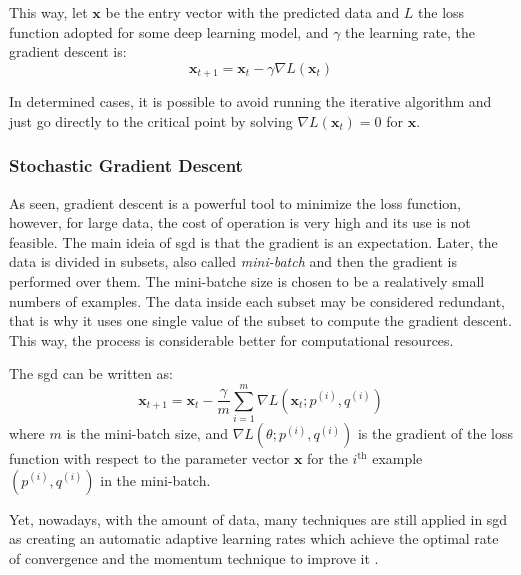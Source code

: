 This way, let \(\symbf{x}\) be the entry vector with the predicted data and \(L\) the loss function adopted for some deep learning model, and \(\gamma\) the learning rate, the gradient descent is:
%
\begin{equation}
    \symbf{x}_{t+1} = \symbf{x}_t - \gamma\nabla L(\symbf{x}_t)
\end{equation}

In determined cases, it is possible to avoid running the iterative algorithm and just go directly to the critical point by solving \(\nabla L(\symbf{x}_t) = 0\) for \(\symbf{x}\).

\subsubsection*{Stochastic Gradient Descent}

As seen, gradient descent is a powerful tool to minimize the loss function, however, for large data, the cost of operation is very high and its use is not feasible. 
The main ideia of \gls*{sgd} is that the gradient is an expectation.
Later, the data is divided in subsets, also called \emph{mini-batch} and then the gradient is performed over them.
The mini-batche size is chosen to be a realatively small numbers of examples.
The data inside each subset may be considered redundant, that is why it uses one single value of the subset to compute the gradient descent.
This way, the process is considerable better for computational resources.

The \gls*{sgd} can be written as:
%
\begin{equation}
    \symbf{x}_{t+1} = \symbf{x}_t - \frac{\gamma}{m} \sum_{i=1}^m \nabla L(\symbf{x}_t; p^{(i)},q^{(i)})
\end{equation}
%
where \(m\) is the mini-batch size, and \(\nabla L(\theta; p^{(i)}, q^{(i)})\) is the gradient of the loss function with respect to the parameter vector \(\symbf{x}\) for the \(i^{\text{th}}\) example \((p^{(i)}, q^{(i)})\) in the mini-batch.

Yet, nowadays, with the amount of data, many techniques are still applied in \gls*{sgd} as creating an automatic adaptive learning rates which achieve the optimal rate of convergence \citep{darken1991} and the momentum technique to improve it \citep{sutskever2013}.